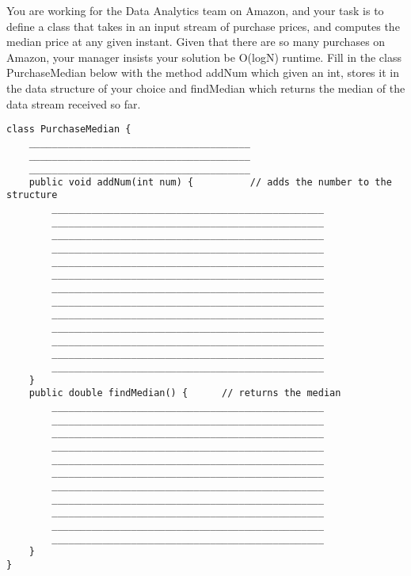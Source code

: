 \question You are working for the Data Analytics team on Amazon, and your task is to define a class that takes in an input stream of purchase prices, and computes the median price at any given instant.
Given that there are so many purchases on Amazon, your manager insists your solution be O(logN) runtime. Fill in the class PurchaseMedian below with the method addNum which given an int, stores it in the data structure of your choice and findMedian which returns the median of the data stream received so far.
\begin{lstlisting}
class PurchaseMedian {
    _______________________________________
    _______________________________________
    _______________________________________
    public void addNum(int num) {          // adds the number to the structure
        ________________________________________________
        ________________________________________________
        ________________________________________________
        ________________________________________________
        ________________________________________________
        ________________________________________________
        ________________________________________________
        ________________________________________________    
        ________________________________________________
        ________________________________________________
        ________________________________________________
        ________________________________________________
        ________________________________________________
    }
    public double findMedian() {      // returns the median
        ________________________________________________
        ________________________________________________
        ________________________________________________
        ________________________________________________
        ________________________________________________
        ________________________________________________
        ________________________________________________
        ________________________________________________
        ________________________________________________
        ________________________________________________
        ________________________________________________
    }
}
\end{lstlisting}

